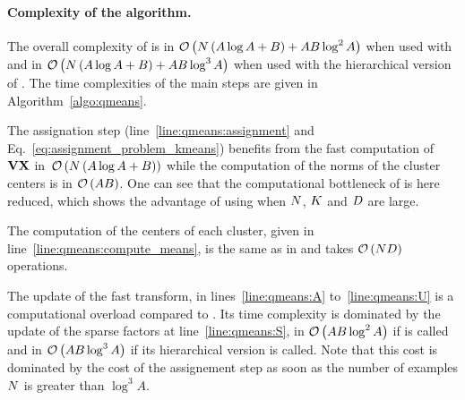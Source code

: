 %

\paragraph{Complexity of the \qkmeans algorithm.} The overall complexity of \qkmeans is in $\mathcal{O}\left (N\left(A\log A+B\right ) + AB \log^2 A\right )$ when used with \palm and in $\mathcal{O}\left (N\left(A\log A+B\right ) + AB \log^3 A\right )$ when used with the hierarchical version of \palm. The time complexities of the main steps are given in Algorithm~\ref{algo:qmeans}. 

The assignation step (line~\ref{line:qmeans:assignment} and Eq.~\eqref{eq:assignment_problem_kmeans}) benefits from the fast computation of ${\mathbf{V}} {\mathbf{X}}$ in~$\mathcal{O}\left (N\left(A\log A+B\right )\right )$ while the computation of the norms of the cluster centers is in $\mathcal{O}\left (AB\right )$.
One can see that the computational bottleneck of \kmeans is here reduced, which shows the advantage of using \qkmeans when $N$, $K$ and $D$ are large.

The computation of the centers of each cluster, given in line~\ref{line:qmeans:compute_means}, is the same as in \kmeans and takes $\mathcal{O}\left (ND\right )$ operations.

The update of the fast transform, in lines~\ref{line:qmeans:A} to~\ref{line:qmeans:U} is a computational overload compared to \kmeans. 
Its time complexity is dominated by the update of the sparse factors at line~\ref{line:qmeans:S}, in $\mathcal{O}\left (AB \log^2 A\right )$ if \palm is called and in $\mathcal{O}\left (AB \log^3 A\right )$ if its hierarchical version is called. 
Note that this cost is dominated by the cost of the assignement step as soon as the number of examples $N$ is greater than $\log^3 A$.


